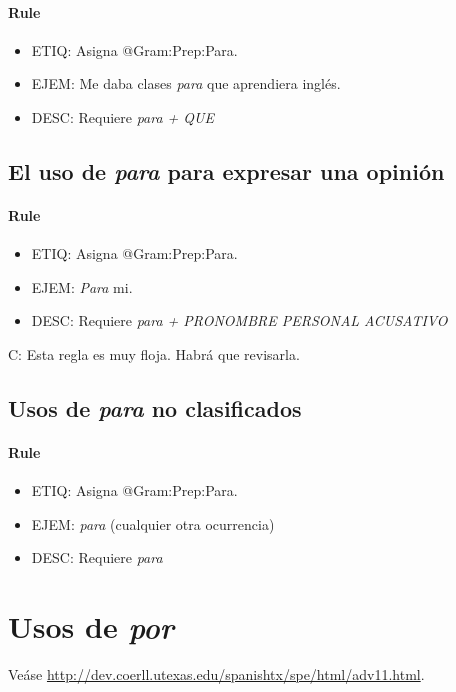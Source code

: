 \documentclass[11pt]{report}
\begin{document}
\paragraph*{Rule}
\begin{itemize}
\item ETIQ: Asigna @Gram:Prep:Para.
\item EJEM: Me daba clases \emph{para} que aprendiera inglés.
\item DESC: Requiere \emph{para + QUE}
\end{itemize}

\subsection{El uso de \emph{para} para expresar una opinión}
\paragraph*{Rule}
\begin{itemize}
\item ETIQ: Asigna @Gram:Prep:Para.
\item EJEM: \emph{Para} mi.
\item DESC: Requiere \emph{para + PRONOMBRE PERSONAL ACUSATIVO}
\end{itemize}

 C: Esta regla es muy floja. Habrá que revisarla.
\subsection{Usos de \emph{para} no clasificados}
\paragraph*{Rule}
\begin{itemize}
\item ETIQ: Asigna @Gram:Prep:Para.
\item EJEM: \emph{para} (cualquier otra ocurrencia)
\item DESC: Requiere \emph{para}
\end{itemize}

\section{Usos de \emph{por}}
Veáse \url{http://dev.coerll.utexas.edu/spanishtx/spe/html/adv11.html}.
\end{document}
